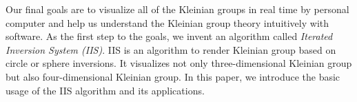 Our final goals are to visualize all of the Kleinian groups in real time by
personal computer and help us understand the Kleinian group theory
intuitively with software.
As the first step to the goals, we invent an algorithm called 
\textit{Iterated Inversion System (IIS)}.
IIS is an algorithm to render Kleinian group based on circle or sphere
inversions.
It visualizes not only three-dimensional Kleinian group but also
four-dimensional Kleinian group.
In this paper, we introduce the basic usage of the IIS algorithm and its
applications.